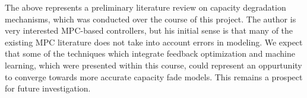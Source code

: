 \documentclass{homework}
\begin{document}
The above represents a preliminary literature review on capacity degradation
mechanisms, which was conducted over the course of this project.
The author is very interested MPC-based controllers, but his initial
sense is that many of the existing MPC literature does not take into account
errors in modeling. We expect that some of the techniques which integrate
feedback optimization and machine learning,
which were presented within this course, could represent an oppurtunity
to converge towards more accurate capacity fade models. This remains
a prospect for future investigation.





\end{document}
